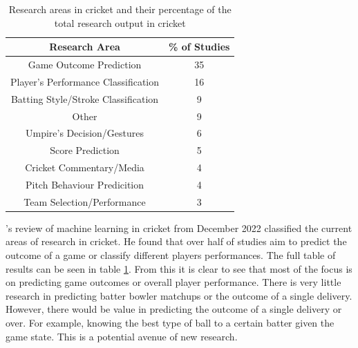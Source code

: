 \documentclass[12pt,a4paper]{report}
\theoremstyle{definition}
\begin{document}

\begin{table}[H] \label{tab:ResearchCrick}
	\centering
	\caption{Research areas in cricket and their percentage of the total research output in cricket \citep{Wickramasinghe2022}}
	\begin{tabular}{| c | c |} 
		\hline
		Research Area & \% of Studies \\ [0.5ex] 
		\hline\hline
		Game Outcome Prediction & 35 \\ 
		\hline
		Player's Performance Classification & 16 \\
		\hline
		Batting Style/Stroke Classification & 9 \\
		\hline
		Other & 9 \\
		\hline
		Umpire's Decision/Gestures & 6 \\
		\hline
		Score Prediction & 5 \\
		\hline
		Cricket Commentary/Media & 4 \\
		\hline
		Pitch Behaviour Predicition & 4 \\
		\hline
		Team Selection/Performance & 3 \\ [1ex] 
		\hline
	\end{tabular}
\end{table}

\citeauthor{Wickramasinghe2022}'s \citeyearpar{Wickramasinghe2022} review of machine learning in cricket from December 2022 classified the current areas of research in cricket. 
He found that over half of studies aim to predict the outcome of a game or classify different players performances. 
The full table of results can be seen in table \ref{tab:ResearchCrick}. 
From this it is clear to see that most of the focus is on predicting game outcomes or overall player performance.
There is very little research in predicting batter bowler matchups or the outcome of a single delivery. 
However, there would be value in predicting the outcome of a single delivery or over. 
For example, knowing the best type of ball to a certain batter given the game state.
This is a potential avenue of new research.
\end{document}
